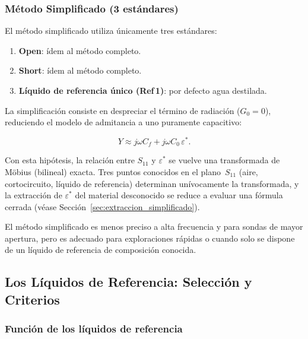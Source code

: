 \subsubsection{Método Simplificado (3 estándares)}
\label{sec:metodo_simplificado}

El método simplificado utiliza únicamente tres estándares:

\begin{enumerate}
    \item \textbf{Open}: ídem al método completo.
    \item \textbf{Short}: ídem al método completo.
    \item \textbf{Líquido de referencia único (Ref\,1)}: por defecto agua destilada.
\end{enumerate}

La simplificación consiste en despreciar el término de radiación ($G_0 = 0$),
reduciendo el modelo de admitancia a uno puramente capacitivo:

\begin{equation}
    Y \approx j\omega C_f + j\omega C_0\,\varepsilon^*.
\end{equation}

Con esta hipótesis, la relación entre $S_{11}$ y $\varepsilon^*$ se vuelve una
transformada de Möbius (bilineal) exacta. Tres puntos conocidos en el plano~$S_{11}$
(aire, cortocircuito, líquido de referencia) determinan unívocamente la transformada,
y la extracción de $\varepsilon^*$ del material desconocido se reduce a evaluar
una fórmula cerrada (véase Sección~\ref{sec:extraccion_simplificado}).

El método simplificado es menos preciso a alta frecuencia y para sondas de mayor
apertura, pero es adecuado para exploraciones rápidas o cuando solo se dispone de
un líquido de referencia de composición conocida.

\newpage
\Encabezado

\subsection{Los Líquidos de Referencia: Selección y Criterios}
\label{sec:liquidos_referencia}

\subsubsection{Función de los líquidos de referencia}

